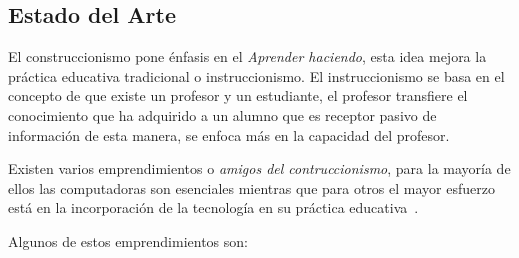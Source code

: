 \subsection{Estado del Arte}

El construccionismo pone énfasis en el \emph{Aprender haciendo}, esta idea
mejora la práctica educativa tradicional o instruccionismo. El instruccionismo
se basa en el concepto de que existe un profesor y un estudiante, el profesor
transfiere el conocimiento que ha adquirido a un alumno que es receptor pasivo
de información de esta manera, se enfoca más en la capacidad del profesor. 

Existen varios emprendimientos o \emph{amigos del contruccionismo}, para la
mayoría de ellos las computadoras son esenciales mientras que para otros el
mayor esfuerzo está en la incorporación de la tecnología en su práctica
educativa~\cite{papertian:const}.

Algunos de estos emprendimientos son:

